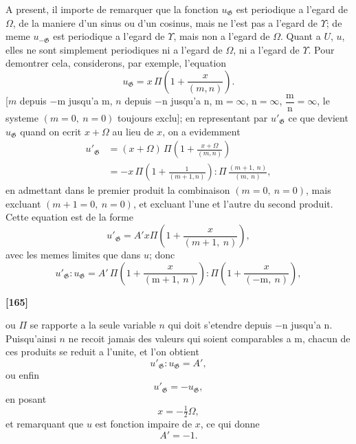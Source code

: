 \documentclass[11pt,a4paper]{article}
\begin{document}
A present, il importe de remarquer que la fonction $u_{\mathfrak{G}}$ est periodique a l'egard
de $\Omega$, de la maniere d'un sinus ou d'un cosinus, mais ne l'est pas a l'egard de $\Upsilon$;
de meme $u_{-\mathfrak{G}}$ est periodique a l'egard de $\Upsilon$, mais non a l'egard de $\Omega$. Quant a $U$, $u$,
elles ne sont simplement periodiques ni a l'egard de $\Omega$, ni a l'egard de $\Upsilon$. Pour
demontrer cela, considerons, par exemple, l'equation
\begin{equation}
u_{\mathfrak{G}} = x\, \Pi \left(1 + \frac{x}{(m, n)}\right). \tag{17}
\end{equation}
[$m$ depuis $-\mathrm{m}$ jusqu'a $\mathrm{m}$, $n$ depuis $-\mathrm{n}$ jusqu'a $\mathrm{n}$, $\mathrm{m} = \infty$, $\mathrm{n} = \infty$, $\dfrac{\mathrm{m}}{\mathrm{n}} = \infty$, le systeme
$(m = 0,\ n = 0)$ toujours exclu]; en representant par $u'_{\mathfrak{G}}$ ce que devient $u_{\mathfrak{G}}$ quand on
ecrit $x + \Omega$ au lieu de $x$, on a evidemment
\begin{align*}
u'_{\mathfrak{G}} &= (x + \Omega)\, \Pi \left(1 + \frac{x + \Omega}{(m, n)}\right)\\
&= -x\, \Pi \left(1 + \frac{1}{(m+1, n)}\right) : \Pi\, \frac{(m+1,\ n)}{(m,\ n)},
\end{align*}
en admettant dans le premier produit la combinaison $(m = 0,\ n = 0)$, mais excluant
$(m+1 = 0,\ n = 0)$, et excluant l'une et l'autre du second produit. Cette equation est
de la forme
\[u'_{\mathfrak{G}} = A'x\Pi \left(1 + \frac{x}{(m+1,\ n)}\right),\]
avec les memes limites que dans $u$; donc
\[u'_{\mathfrak{G}} : u_{\mathfrak{G}} = A'\, \Pi \left(1 + \frac{x}{(\mathrm{m}+1,\ n)}\right) : \Pi \left(1 + \frac{x}{(-\mathrm{m},\ n)}\right),\]

\textbf{[165]}

ou $\Pi$ se rapporte a la seule variable $n$ qui doit s'etendre depuis $-\mathrm{n}$ jusqu'a $\mathrm{n}$.
Puisqu'ainsi $n$ ne recoit jamais des valeurs qui soient comparables a $\mathrm{m}$, chacun de
ces produits se reduit a l'unite, et l'on obtient
\[u'_{\mathfrak{G}} : u_{\mathfrak{G}} = A',\]
ou enfin
\begin{equation}
u'_{\mathfrak{G}} = -u_{\mathfrak{G}}, \tag{18}
\end{equation}
en posant
\[x = -\tfrac{1}{2}\Omega,\]
et remarquant que $u$ est fonction impaire de $x$, ce qui donne
\[A' = -1.\]
\end{document}
